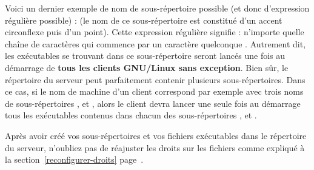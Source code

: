 Voici un dernier exemple de nom de sous-répertoire possible (et donc d'expression
régulière possible) :
 (le nom de ce sous-répertoire est
constitué d'un accent circonflexe puis d'un point).
Cette expression régulière signifie : \og n'importe quelle
chaîne de caractères qui commence par un caractère quelconque \fg{}.
Autrement dit, les exécutables se trouvant dans ce sous-répertoire
seront lancés une fois au démarrage de \textbf{tous les clients GNU/Linux sans exception}.
Bien sûr, le répertoire  du serveur peut parfaitement
contenir plusieurs sous-répertoires. Dans ce cas, si le nom de machine d'un client
correspond par exemple avec trois noms de sous-répertoires
,  et , alors le client devra
lancer une seule fois au démarrage tous les exécutables contenus dans chacun des
sous-répertoires ,  et .

\begin{alerte}
Après avoir créé vos sous-répertoires et vos fichiers
exécutables dans le répertoire  du serveur,
n'oubliez pas de réajuster les droits sur les fichiers comme expliqué
à la section~\ref{reconfigurer-droits} page~\pageref{reconfigurer-droits}.
\end{alerte}


